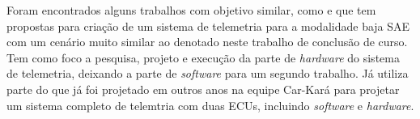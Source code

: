 Foram encontrados alguns trabalhos com objetivo similar, como \cite{Dias2010} e \cite{Nunes2016} que tem propostas para criação de um sistema de telemetria para a modalidade baja SAE com um cenário muito similar ao denotado neste trabalho de conclusão de curso. \cite{Dias2010} Tem como foco a pesquisa, projeto e execução da parte de \textit{hardware} do sistema de telemetria, deixando a parte de \textit{software} para um segundo trabalho. Já \cite{Nunes2016} utiliza parte do que já foi projetado em outros anos na equipe Car-Kará para projetar um sistema completo de telemtria com duas ECUs, incluindo \textit{software} e \textit{hardware}.  

